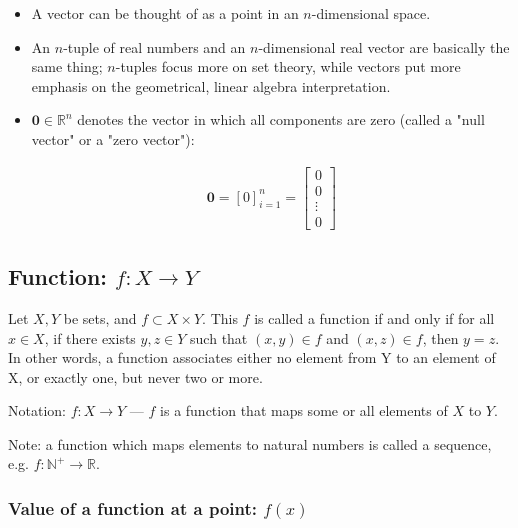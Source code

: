 \documentclass[titlepage]{article}
\begin{document}
        \begin{itemize}
          \item A vector can be thought of as a point in an $n$-dimensional
                space.

          \item An $n$-tuple of real numbers and an $n$-dimensional real vector
                are basically the same thing; $n$-tuples focus more on set
                theory, while vectors put more emphasis on the geometrical,
                linear algebra interpretation.

          \item $\mathbf{0} \in \mathbb{R}^n$ denotes the vector in which all
                components are zero (called a "null vector" or a "zero vector"):

                \begin{align*}
                  \mathbf{0} = \left[ 0 \right]_{i=1}^n
                    = \begin{bmatrix}
                        0 \\
                        0 \\
                        \vdots \\
                        0
                      \end{bmatrix}
                \end{align*}
        \end{itemize}

      \subsection{Function: $f : X \rightarrow Y$}

        Let $X, Y$ be sets, and $f \subset X \times Y$. This $f$ is called a
        function if and only if for all $x \in X$, if there exists
        $y, z \in Y$ such that $(x, y) \in f$ and $(x, z) \in f$, then
        $y = z$. In other words, a function associates either no element from Y
        to an element of X, or exactly one, but never two or more.

        Notation: $f : X \rightarrow Y$ --- $f$ is a function that maps some or
        all elements of $X$ to $Y$.

        Note: a function which maps elements to natural numbers is called a
        sequence, e.g. $f : \mathbb{N}^+ \rightarrow \mathbb{R}$.

        \subsubsection{Value of a function at a point: $f(x)$}
\end{document}
